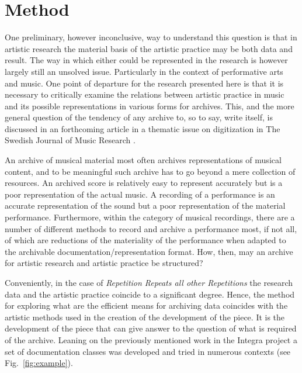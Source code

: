 \documentclass[runningheads,a4paper]{llncs}
\begin{document}
\section{Method}
\label{sec:method}

One preliminary, however inconclusive, way to understand this question is that in artistic research the material basis of the artistic practice may be both data and result. The way in which either could be represented in the research is however largely still an unsolved issue. Particularly in the context of performative arts and music. One point of departure for the research presented here is that it is necessary to critically examine the relations between artistic practice in music and its possible representations in various forms for archives. This, and the more general question of the tendency of any archive to, so to say, write itself, is discussed in an forthcoming article in a thematic issue on digitization in The Swedish Journal of Music Research \cite{frisk16}.

An archive of musical material most often archives representations of musical content, and to be meaningful such archive has to go beyond a mere collection of resources. An archived score is relatively easy to represent accurately but is a poor representation of the actual music. A recording of a performance is an accurate representation of the sound but a poor representation of the material performance. Furthermore, within the category of musical recordings, there are a number of different methods to record and archive a performance most, if not all, of which are reductions of the materiality of the performance when adapted to the archivable documentation/representation format. How, then, may an archive for artistic research and artistic practice be structured?

Conveniently, in the case of \emph{Repetition Repeats all other Repetitions} the research data and the artistic practice coincide to a significant degree. Hence, the method for exploring what are the efficient means for archiving data coincides with the artistic methods used in the creation of the development of the piece. It is the development of the piece that can give answer to the question of what is required of the archive. Leaning on the previously mentioned work in the Integra project a set of documentation classes was developed and tried in numerous contexts (see Fig.~\ref{fig:example}).
\end{document}
